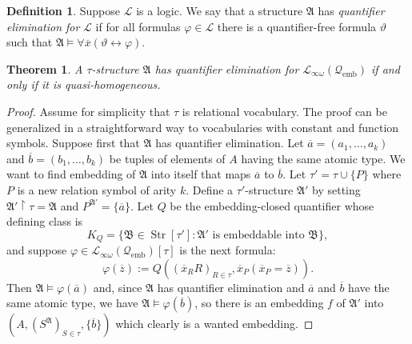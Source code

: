 \documentclass{ndjflart}
\theoremstyle{plain}
\newtheorem{theorem}[conjecture]{Theorem}
\theoremstyle{definition}
\newtheorem{definition}[conjecture]{Definition}
\numberwithin{equation}{section}
\DeclareMathOperator{\emb}{emb}
\DeclareMathOperator{\Str}{Str}
\begin{document}
\begin{definition}
Suppose $\mathcal{L}$ is a logic.
We say that a structure $\mathfrak{A}$ has \emph{quantifier elimination for}
$\mathcal{L}$ if for all formulas $\varphi \in \mathcal{L}$ there is a
quantifier-free formula $\vartheta$ such that
$\mathfrak{A} \vDash \forall \overline{x}(\vartheta \leftrightarrow \varphi)$.
\end{definition}

\begin{theorem}\label{homog}
A $\tau$-structure $\mathfrak{A}$ has quantifier elimination for
$\mathcal{L}_{\infty\omega}(\mathcal{Q}_{\emb})$ if and only if it is
quasi-homogeneous.
\end{theorem}
\begin{proof}
Assume for simplicity that $\tau$ is relational vocabulary.
The proof can be generalized in a straightforward way to vocabularies with
constant and function symbols.
Suppose first that $\mathfrak{A}$ has quantifier elimination.
Let $\overline{a} = (a_1,\dots,a_k)$ and $\overline{b} = (b_1,\dots,b_k)$ be
tuples of elements of $A$ having the same atomic type.
We want to find embedding of $\mathfrak{A}$ into itself that maps
$\overline{a}$ to $\overline{b}$.
Let $\tau' = \tau \cup \{P\}$ where $P$ is a new relation symbol of arity $k$.
Define a $\tau'$-structure $\mathfrak{A}'$ by setting
$\mathfrak{A}'\upharpoonright \tau = \mathfrak{A}$ and
$P^{\mathfrak{A}'} = \{\overline{a}\}$.
Let $Q$ be the embedding-closed quantifier whose defining class is
\[
	K_Q = \{\mathfrak{B} \in \Str[\tau'] \colon \mathfrak{A}' 
	\text{ is embeddable into } \mathfrak{B}\},
\]
and suppose $\varphi \in \mathcal{L}_{\infty\omega}(\mathcal{Q}_{\emb})[\tau]$
is the next formula:
\[
	\varphi(\overline{z}) :=
	Q((\overline{x}_RR)_{R\in\tau},\overline{x}_P(\overline{x}_P=\overline{z})).
\]
Then $\mathfrak{A} \vDash \varphi(\overline{a})$ and, since $\mathfrak{A}$ has
quantifier elimination and $\overline{a}$ and $\overline{b}$ have the same
atomic type, we have $\mathfrak{A} \vDash \varphi(\overline{b})$, so there is an
embedding $f$ of $\mathfrak{A}'$ into
$(A,(S^{\mathfrak{A}})_{S\in\tau}, \{\overline{b}\})$ which clearly is a wanted
embedding.


\end{proof}
\end{document}
